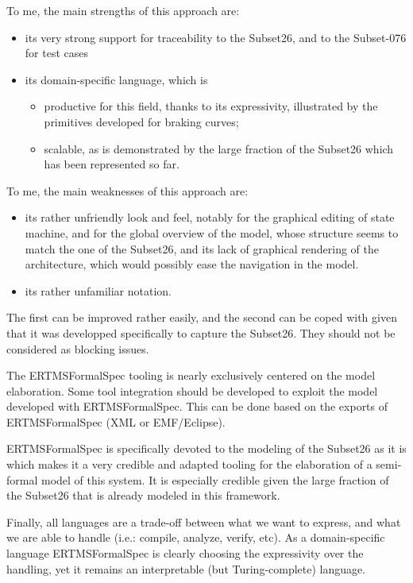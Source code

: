 \begin{assessor1}
To me, the main strengths of this approach are: 
\begin{itemize}
\item its very strong support for traceability to the Subset26, and to the Subset-076 for test cases
\item its domain-specific language, which is
\begin{itemize}
\item productive for this field, thanks to its expressivity, illustrated by the primitives developed for braking curves; 
\item scalable, as is demonstrated by the large fraction of the Subset26 which has been represented so far. 
\end{itemize}
\end{itemize}

To me, the main weaknesses of this approach are: 
\begin{itemize}
\item its rather unfriendly look and feel, notably for the graphical editing of state machine, and for the global overview of the model, whose structure seems to match the one of the Subset26, and its lack of graphical rendering of the architecture, which would possibly ease the navigation in the model. 
\item its rather unfamiliar notation. 
\end{itemize}
The first can be improved rather easily, and the second can be coped with given that it was developped specifically to capture the Subset26. They should not be considered as blocking issues. 

The ERTMSFormalSpec tooling is nearly exclusively centered on the model elaboration. Some tool integration should be developed to exploit the model developed with ERTMSFormalSpec. This can be done based on the exports of ERTMSFormalSpec (XML or EMF/Eclipse). 

ERTMSFormalSpec is specifically devoted to the modeling of the Subset26 as it is which makes it a very credible and adapted tooling for the elaboration of a semi-formal model of this system. It is especially credible given the large fraction of the Subset26 that is already modeled in this framework. 

Finally, all languages are a trade-off between what we want to express, and what we are able to handle (i.e.: compile, analyze, verify, etc). As a domain-specific language ERTMSFormalSpec is clearly choosing the expressivity over the handling, yet it remains an interpretable (but Turing-complete) language. 
\end{assessor1}

